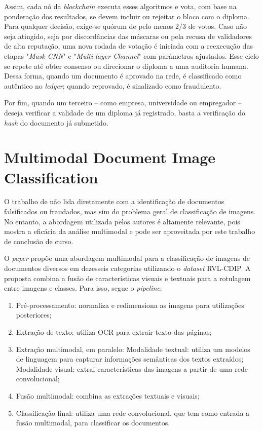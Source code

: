 Assim, cada nó da \textit{blockchain} executa esses algoritmos e vota, com base na ponderação dos resultados, se devem incluir ou rejeitar o bloco com o diploma. Para qualquer decisão, exige-se quórum de pelo menos $2/3$ de votos. Caso não seja atingido, seja por discordâncias das máscaras ou pela recusa de validadores de alta reputação, uma nova rodada de votação é iniciada com a reexecução das etapas "\textit{Mask CNN}" e "\textit{Multi-layer Channel}" com parâmetros ajustados. Esse ciclo se repete até obter consenso ou direcionar o diploma a uma auditoria humana. Dessa forma, quando um documento é aprovado na rede, é classificado como autêntico no \textit{ledger}; quando reprovado, é sinalizado como fraudulento.

Por fim, quando um terceiro -- como empresa, universidade ou empregador -- deseja verificar a validade de um diploma já registrado, basta a verificação do \textit{hash} do documento já submetido.

\section{Multimodal Document Image Classification}

O trabalho de \citeauthor*{multimodal} \cite*{multimodal} não lida diretamente com a identificação de documentos falsificados ou fraudados, mas sim do problema geral de classificação de imagens. No entanto, a abordagem utilizada pelos autores é altamente relevante, pois mostra a eficácia da análise multimodal e pode ser aproveitada por este trabalho de conclusão de curso.

O \textit{paper} propõe uma abordagem multimodal para a classificação de imagens de documentos diversos em dezesseis categorias utilizando o \textit{dataset} RVL-CDIP. A proposta combina a fusão de características visuais e textuais para a rotulagem entre imagens e classes. Para isso, segue o \textit{pipeline}:

\begin{enumerate}
    \item Pré-processamento: normaliza e redimensiona as imagens para utilizações posteriores;
    \item Extração de texto: utiliza OCR para extrair texto das páginas;
    \item Extração multimodal, em paralelo:
    \subitem Modalidade textual: utiliza um modelos de linguagem para capturar informações semânticas dos textos extraídos;
    \subitem Modalidade visual: extrai características das imagens a partir de uma rede convolucional;
    \item Fusão multimodal: combina as extrações textuais e visuais;
    \item Classificação final: utiliza uma rede convolucional, que tem como entrada a fusão multimodal, para classificar os documentos.
\end{enumerate}


